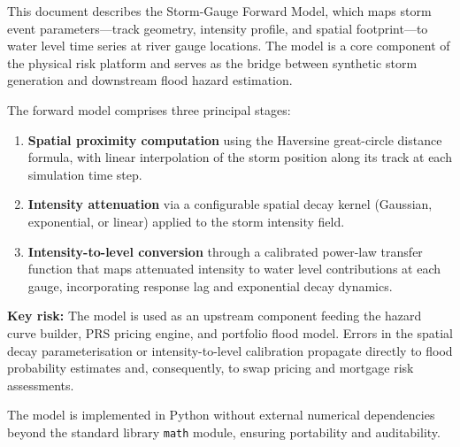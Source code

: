 \documentclass[11pt,a4paper]{article}
\begin{document}
\mkmtitlepage
\mkmlegalpage
\tableofcontents
\clearpage

\mkmexecsummary

This document describes the Storm-Gauge Forward Model, which maps storm event
parameters---track geometry, intensity profile, and spatial footprint---to water
level time series at river gauge locations. The model is a core component of the
physical risk platform and serves as the bridge between synthetic storm generation
and downstream flood hazard estimation.

The forward model comprises three principal stages:
\begin{enumerate}[nosep]
    \item \textbf{Spatial proximity computation} using the Haversine great-circle
          distance formula, with linear interpolation of the storm position along
          its track at each simulation time step.
    \item \textbf{Intensity attenuation} via a configurable spatial decay kernel
          (Gaussian, exponential, or linear) applied to the storm intensity field.
    \item \textbf{Intensity-to-level conversion} through a calibrated power-law
          transfer function that maps attenuated intensity to water level
          contributions at each gauge, incorporating response lag and exponential
          decay dynamics.
\end{enumerate}

\textbf{Key risk:} The model is used as an upstream component feeding the hazard
curve builder, PRS pricing engine, and portfolio flood model. Errors in the
spatial decay parameterisation or intensity-to-level calibration propagate directly
to flood probability estimates and, consequently, to swap pricing and mortgage
risk assessments.

The model is implemented in Python without external numerical dependencies beyond
the standard library \texttt{math} module, ensuring portability and auditability.

\mkmpurpose
\end{document}
